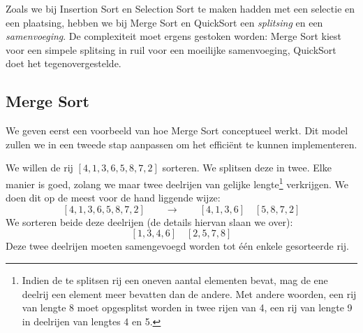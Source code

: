 Zoals we bij Insertion Sort en Selection Sort te maken hadden met een selectie en een plaatsing,
hebben we bij Merge Sort en QuickSort een \emph{splitsing} en een \emph{samenvoeging}.
De complexiteit moet ergens gestoken worden: Merge Sort kiest voor een simpele splitsing
in ruil voor een moeilijke samenvoeging, QuickSort doet het tegenovergestelde.

\subsection{Merge Sort} \label{sec:sorteren:merge-sort}
We geven eerst een voorbeeld van hoe Merge Sort conceptueel werkt. Dit model
zullen we in een tweede stap aanpassen om het effici\"ent te kunnen implementeren.

\begin{example} \label{example:sorteer:mergesort}
We willen de rij $[4,1,3,6,5,8,7,2]$ sorteren. We splitsen deze in twee.
Elke manier is goed, zolang we maar twee deelrijen van gelijke lengte\footnote{Indien de te splitsen
rij een oneven aantal elementen bevat, mag de ene deelrij een element meer bevatten dan de andere.
Met andere woorden, een rij van lengte 8 moet opgesplitst worden in twee rijen van 4,
een rij van lengte 9 in deelrijen van lengtes 4 en 5.} verkrijgen.
We doen dit op de meest voor de hand liggende wijze:
\[
  [4,1,3,6,5,8,7,2] \qquad\rightarrow\qquad [4,1,3,6] \quad [5,8,7,2]
\]
We sorteren beide deze deelrijen (de details hiervan slaan we over):
\[
  [1,3,4,6] \quad [2,5,7,8]
\]
Deze twee deelrijen moeten samengevoegd worden tot \'e\'en enkele gesorteerde rij.



\end{example}
